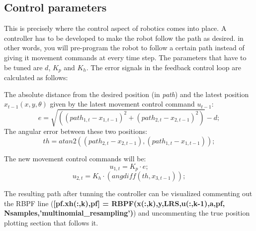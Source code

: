\subsection{Control parameters}
\label{Errors}
This is precisely where the control aspect of robotics comes into place. A controller has to be developed to make the robot follow the path as desired. in other words, you will pre-program the robot to follow a certain path instead of giving it movement commands at every time step. The parameters that have to be tuned are $d$, $K_p$ and $K_h$. The error signals in the feedback control loop are calculated as follows:

The absolute distance from the desired position (in \textit{path}) and the latest position $x_{t-1}(x,y,\theta)$ given by the latest movement control command $u_{t-1}$: 
\begin{equation}
	e = \sqrt{((path_{1, t}-x_{1, t-1})^2 + (path_{2, t}-x_{2, t-1})^2)} - d;
\end{equation}
The angular error between these two positions:
\begin{equation}
	th = atan2((path_{2, t}-x_{2, t-1}),(path_{1, t}-x_{1, t-1}));
\end{equation}

The new movement control commands will be:
\begin{equation}
	u_{1, t} = K_p \cdot e;
\end{equation}
\begin{equation}
	u_{2, t} = K_h \cdot (angdiff(th,x_{3, t-1}));
\end{equation}

The resulting path after tunning the controller can be visualized commenting out the RBPF line (\textbf{[pf.xh(:,k),pf] = RBPF(x(:,k),y,LRS,u(:,k-1),a,pf, Nsamples,'multinomial\_resampling')}) and uncommenting the true position plotting section that follows it.


